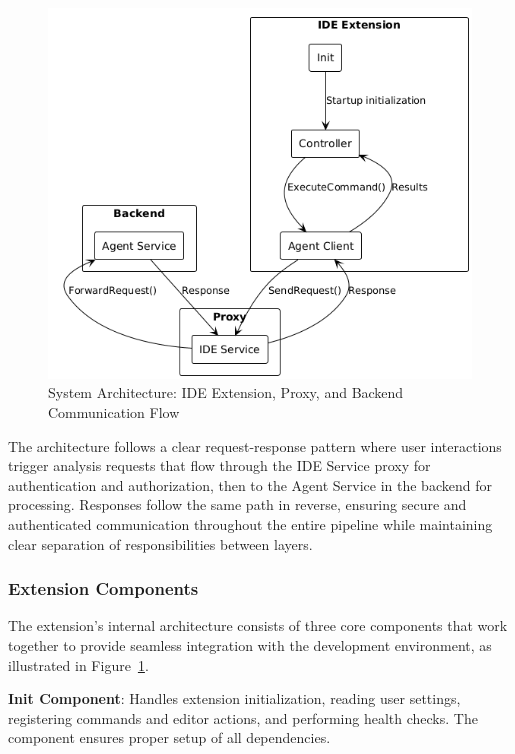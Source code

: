 \begin{spacing}{1.2}
\begin{figure}[H]
    \centering
    \includegraphics[scale=0.6]{Images/extension_integration.png}
    \caption{System Architecture: IDE Extension, Proxy, and Backend Communication Flow}
    \label{fig:high_level_frontend_architecture}
\end{figure}

The architecture follows a clear request-response pattern where user interactions trigger analysis requests that flow through the IDE Service proxy for authentication and authorization, then to the Agent Service in the backend for processing. Responses follow the same path in reverse, ensuring secure and authenticated communication throughout the entire pipeline while maintaining clear separation of responsibilities between layers.

\subsubsection{Extension Components}
The extension's internal architecture consists of three core components that work together to provide seamless integration with the development environment, as illustrated in Figure~\ref{fig:high_level_frontend_architecture}.

\textbf{Init Component}: Handles extension initialization, reading user settings, registering commands and editor actions, and performing health checks. The component ensures proper setup of all dependencies.


\end{spacing}
